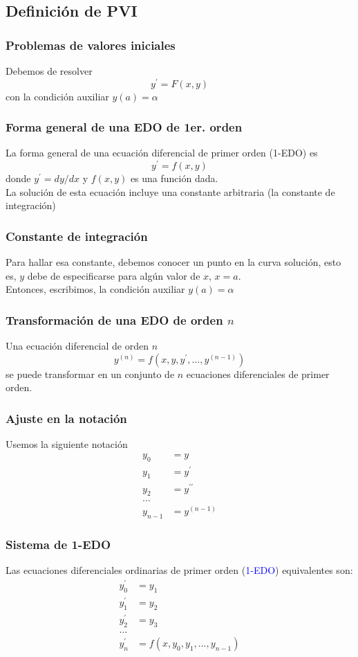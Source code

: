 \subsection{Definición de PVI}
\begin{frame}
\frametitle{Problemas de valores iniciales}
Debemos de resolver
\[ y^{\prime} = F(x, y)\]
con la condición auxiliar $y(a) = \alpha$
\end{frame}
\begin{frame}
\frametitle{Forma general de una EDO de 1er. orden}
La forma general de una ecuación diferencial de primer orden (1-EDO) es
\[ y^{\prime} = f(x, y) \]
donde $y^{\prime} = dy/dx$ y $f(x, y)$ es una función dada.
\\
\bigskip
La solución de esta ecuación incluye una constante arbitraria (la constante de integración)
\end{frame}
\begin{frame}
\frametitle{Constante de integración}
Para hallar esa constante, debemos conocer un punto en la curva solución, esto es, $y$ debe de especificarse para algún valor de $x$, $x = a$.
\\
\bigskip
Entonces, escribimos, la condición auxiliar $y(a) = \alpha$
\end{frame}
\begin{frame}
\frametitle{Transformación de una EDO de orden $n$}
Una ecuación diferencial de orden $n$
\[y^{(n)} = f(x, y, y^{\prime}, \ldots, y^{(n - 1)})\]
se puede transformar en un conjunto de $n$ ecuaciones diferenciales de primer orden.
\end{frame}
\begin{frame}
\frametitle{Ajuste en la notación}
Usemos la siguiente notación
\begin{align*}
y_{0} & =y \\
y_{1} & = y^{\prime} \\
y_{2} & =y^{\prime \prime} \\
\ldots \\
y_{n - 1} &= y^{(n - 1)}
\end{align*}
\end{frame}
\begin{frame}
\frametitle{Sistema de 1-EDO}
Las ecuaciones diferenciales ordinarias de primer orden (\textcolor{blue}{1-EDO}) equivalentes son:
\begin{align*}
y^{\prime}_{0} & =y_{1} \\
y^{\prime}_{1} & = y_{2} \\
y^{\prime}_{2} & = y_{3} \\
\ldots \\
y^{\prime}_{n} & = f(x, y_{0}, y_{1}, \ldots, y_{n-1})
\end{align*}
\end{frame}
